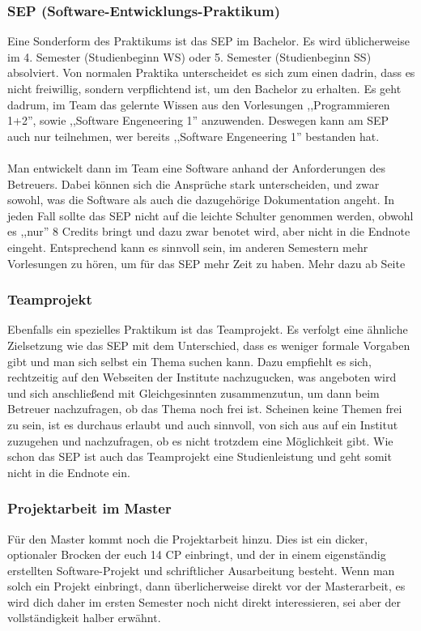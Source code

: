 \subsubsection*{SEP (Software-Entwicklungs-Praktikum)}
Eine Sonderform des Praktikums ist das SEP im Bachelor. Es wird
üblicherweise im 4. Semester (Studienbeginn WS) oder 5. Semester
(Studienbeginn SS) absolviert. Von normalen Praktika
unterscheidet es sich zum einen dadrin, dass es nicht freiwillig,
sondern verpflichtend ist, um den Bachelor zu erhalten. Es geht
dadrum, im Team das gelernte Wissen aus den Vorlesungen
,,Programmieren 1+2'', sowie ,,Software Engeneering 1''
anzuwenden. Deswegen kann am SEP auch nur teilnehmen, wer bereits
,,Software Engeneering 1''%
bestanden hat.\\\\
Man entwickelt dann im Team eine Software anhand der Anforderungen des
Betreuers. Dabei können sich die Ansprüche stark unterscheiden, und
zwar sowohl, was die Software als auch die dazugehörige Dokumentation
angeht. In jeden Fall sollte das SEP nicht auf die leichte Schulter
genommen werden, obwohl es ,,nur'' 8 Credits bringt und dazu zwar
benotet wird, aber nicht in die Endnote eingeht. Entsprechend kann es
sinnvoll sein, im anderen Semestern mehr Vorlesungen zu hören, um für
das SEP mehr Zeit zu haben. Mehr dazu ab Seite \pageref{bach_studienplan}

\subsubsection*{Teamprojekt}
Ebenfalls ein spezielles Praktikum ist das Teamprojekt. Es verfolgt
eine ähnliche Zielsetzung wie das SEP mit dem Unterschied, dass es
weniger formale Vorgaben gibt und man sich selbst ein Thema suchen
kann. Dazu empfiehlt es sich, rechtzeitig auf den Webseiten der
Institute nachzugucken, was angeboten wird und sich anschließend mit
Gleichgesinnten zusammenzutun, um dann beim Betreuer nachzufragen, ob
das Thema noch frei ist. Scheinen keine Themen frei zu sein, ist es
durchaus erlaubt und auch sinnvoll, von sich aus auf ein Institut
zuzugehen und nachzufragen, ob es nicht trotzdem eine Möglichkeit
gibt. Wie schon das SEP ist auch das Teamprojekt eine Studienleistung
und geht somit nicht in die Endnote ein.

\subsubsection*{Projektarbeit im Master}
Für den Master kommt noch die Projektarbeit hinzu. Dies ist ein dicker, 
optionaler Brocken der euch 14 CP einbringt, und der in einem eigenständig 
erstellten Software-Projekt und schriftlicher Ausarbeitung besteht. 
Wenn man solch ein Projekt einbringt, dann überlicherweise direkt vor der 
Masterarbeit, es wird dich daher im ersten Semester noch nicht direkt 
interessieren, sei aber der vollständigkeit halber erwähnt.

